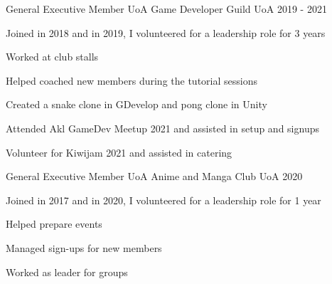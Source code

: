 

\begin{cventries}

  \cventry
    {General Executive Member} %
    {UoA Game Developer Guild} %
    {UoA} %
    {2019 - 2021} %
    {
      \begin{cvitems} %
        \item {Joined in 2018 and in 2019, I volunteered for a leadership role for 3 years}
        \item {Worked at club stalls}
        \item {Helped coached new members during the tutorial sessions}
        \item {Created a snake clone in GDevelop and pong clone in Unity}
        \item {Attended Akl GameDev Meetup 2021 and assisted in setup and signups}
        \item {Volunteer for Kiwijam 2021 and assisted in catering}
      \end{cvitems}
    }

  \cventry
    {General Executive Member} %
    {UoA Anime and Manga Club} %
    {UoA} %
    {2020} %
    {
      \begin{cvitems} %
        \item {Joined in 2017 and in 2020, I volunteered for a leadership role for 1 year}
        \item {Helped prepare events}
        \item {Managed sign-ups for new members}
        \item {Worked as leader for groups}
      \end{cvitems}
    }


\end{cventries}
